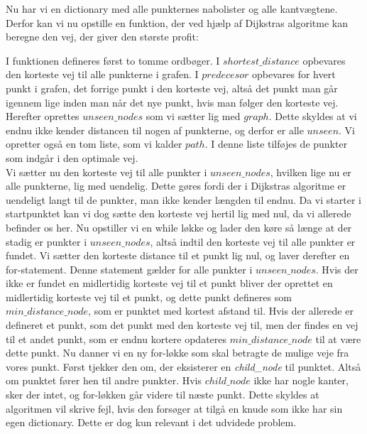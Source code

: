 Nu har vi en dictionary med alle punkternes nabolister og alle kantvægtene. Derfor kan vi nu opstille en funktion, der ved hjælp af Dijkstras algoritme kan beregne den vej, der giver den største profit:



I funktionen defineres først to tomme ordbøger. I $shortest\_distance$ opbevares den korteste vej til alle punkterne i grafen. I $predecesor$ opbevares for hvert punkt i grafen, det forrige punkt i den korteste vej, altså det punkt man går igennem lige inden man når det nye punkt, hvis man følger den korteste vej. Herefter oprettes $unseen\_nodes$ som vi sætter lig med $graph$. Dette skyldes at vi endnu ikke kender distancen til nogen af punkterne, og derfor er alle $unseen$. Vi opretter også en tom liste, som vi kalder $path$. I denne liste tilføjes de punkter som indgår i den optimale vej.\\
Vi sætter nu den korteste vej til alle punkter i $unseen\_nodes$, hvilken lige nu er alle punkterne, lig med uendelig. Dette gøres fordi der i Dijkstras algoritme er uendeligt langt til de punkter, man ikke kender længden til endnu. Da vi starter i startpunktet kan vi dog sætte den korteste vej hertil lig med nul, da vi allerede befinder os her.
Nu opstiller vi en while løkke og lader den køre så længe at der stadig er punkter i $unseen\_nodes$, altså indtil den korteste vej til alle punkter er fundet.
Vi sætter den korteste distance til et punkt lig nul, og laver derefter en for-statement. Denne statement gælder for alle punkter i $unseen\_nodes$. Hvis der ikke er fundet en midlertidig korteste vej til et punkt bliver der oprettet en midlertidig korteste vej til et punkt, og dette punkt defineres som $min\_distance\_node$, som er punktet med kortest afstand til. Hvis der allerede er defineret et punkt, som det punkt med den korteste vej til, men der findes en vej til et andet punkt, som er endnu kortere opdateres $min\_distance\_node$ til at være dette punkt.
Nu danner vi en ny for-løkke som skal betragte de mulige veje fra vores punkt.
Først tjekker den om, der eksisterer en \emph{child\_node} til punktet. Altså om punktet fører hen til andre punkter. Hvis $child\_node$ ikke har nogle kanter, sker der intet, og for-løkken går videre til næste punkt. Dette skyldes at algoritmen vil skrive fejl, hvis den forsøger at tilgå en knude som ikke har sin egen dictionary. Dette er dog kun relevant i det udvidede problem.
